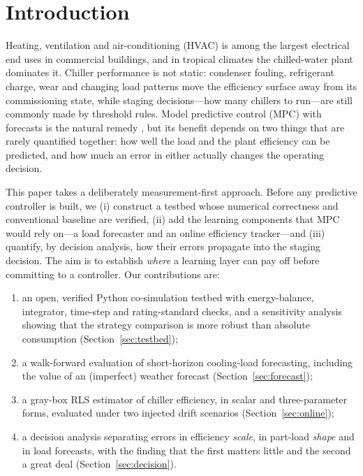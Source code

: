\documentclass{svproc}
\begin{document}
\section{Introduction}
Heating, ventilation and air-conditioning (HVAC) is among the largest electrical end uses in commercial buildings, and in tropical climates the chilled-water plant dominates it. Chiller performance is not static: condenser fouling, refrigerant charge, wear and changing load patterns move the efficiency surface away from its commissioning state, while staging decisions---how many chillers to run---are still commonly made by threshold rules. Model predictive control (MPC) with forecasts is the natural remedy \cite{afram2014,oldewurtel2012,sturzenegger2016}, but its benefit depends on two things that are rarely quantified together: how well the load and the plant efficiency can be predicted, and how much an error in either actually changes the operating decision.

This paper takes a deliberately measurement-first approach. Before any predictive controller is built, we (i) construct a testbed whose numerical correctness and conventional baseline are verified, (ii) add the learning components that MPC would rely on---a load forecaster and an online efficiency tracker---and (iii) quantify, by decision analysis, how their errors propagate into the staging decision. The aim is to establish \emph{where} a learning layer can pay off before committing to a controller. Our contributions are:
\begin{enumerate}
\item an open, verified Python co-simulation testbed with energy-balance, integrator, time-step and rating-standard checks, and a sensitivity analysis showing that the strategy comparison is more robust than absolute consumption (Section~\ref{sec:testbed});
\item a walk-forward evaluation of short-horizon cooling-load forecasting, including the value of an (imperfect) weather forecast (Section~\ref{sec:forecast});
\item a gray-box RLS estimator of chiller efficiency, in scalar and three-parameter forms, evaluated under two injected drift scenarios (Section~\ref{sec:online});
\item a decision analysis separating errors in efficiency \emph{scale}, in part-load \emph{shape} and in load forecasts, with the finding that the first matters little and the second a great deal (Section~\ref{sec:decision}).
\end{enumerate}
\end{document}
